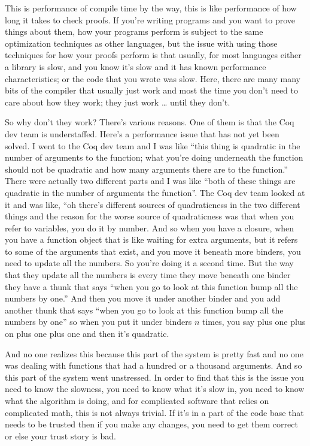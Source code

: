 \begin{subappendices}
This is performance of compile time by the way, this is like performance of how long it takes to check proofs.  If you're writing programs and you want to prove things about them, how your programs perform is subject to the same optimization techniques as other languages, but the issue with using those techniques for how your proofs perform is that usually, for most languages either a library is slow, and you know it's slow and it has known performance characteristics; or the code that you wrote was slow. Here, there are many many bits of the compiler that usually just work and most the time you don't need to care about how they work; they just work \ldots{} until they don't.

So why don't they work?  There's various reasons.  One of them is that the Coq dev team is understaffed. Here's a performance issue that has not yet been solved. I went to the Coq dev team and I was like ``this thing is quadratic in the number of arguments to the function; what you're doing underneath the function should not be quadratic and how many arguments there are to the function.''  There were actually two different parts and I was like ``both of these things are quadratic in the number of arguments the function''.  The Coq dev team looked at it and was like, ``oh there's different sources of quadraticness in the two different things and the reason for the worse source of quadraticness was that when you refer to variables, you do it by number. And so when you have a closure, when you have a function object that is like waiting for extra arguments, but it refers to some of the arguments that exist, and you move it beneath more binders, you need to update all the numbers.  So you're doing it a second time. But the way that they update all the numbers is every time they move beneath one binder they have a thunk that says ``when you go to look at this function bump all the numbers by one.'' And then you move it under another binder and you add another thunk that says ``when you go to look at this function bump all the numbers by one'' so when you put it under binders $n$ times, you say plus one plus on plus one plus one and then it's quadratic. 

And no one realizes this because this part of the system is pretty fast and no one was dealing with functions that had a hundred or a thousand arguments. And so this part of the system went unstressed.  In order to find that this is the issue you need to know the slowness, you need to know what it's slow in, you need to know what the algorithm is doing, and for complicated software that relies on complicated math, this is not always trivial. If it's in a part of the code base that needs to be trusted then if you make any changes, you need to get them correct or else your trust story is bad. 


\end{subappendices}
